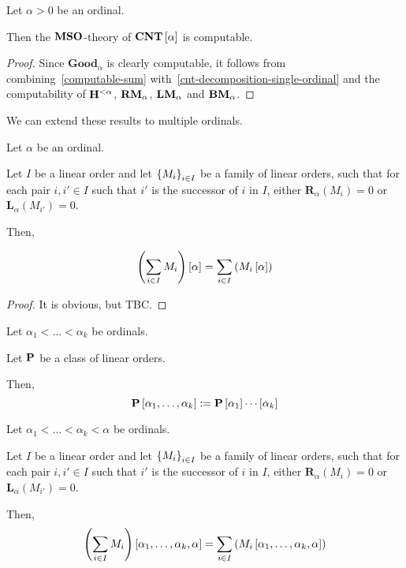 \begin{lemma}\label{cnt-decidable-single-ordinal}
  Let $\alpha > 0$ be an ordinal.

  Then the $\mathbf{MSO}$-theory of $\mathbf{CNT} \left[ {\alpha} \right]$ is computable.
\end{lemma}

\begin{proof}
  Since $\mathbf{Good}_{\alpha}$ is clearly computable,
  it follows from combining~\cref{computable-sum}
  with~\cref{cnt-decomposition-single-ordinal}
  and the computability of $\mathbf{H}^{< \alpha}$,
  $\mathbf{RM}_{\alpha}$, $\mathbf{LM}_{\alpha}$ and $\mathbf{BM}_{\alpha}$.
\end{proof}

We can extend these results to multiple ordinals.

\begin{lemma}\label{extend-lemma-single-ordinal}
  Let $\alpha$ be an ordinal.

  Let $I$ be a linear order
  and let $\left\{ {M_i} \right\}_{i \in I}$ be a family of linear orders,
  such that for each pair $i, i' \in I$
  such that $i'$ is the successor of $i$ in $I$,
  either $\mathbf{R}_\alpha(M_{i}) = 0$ or $\mathbf{L}_\alpha(M_{i'}) = 0$.

  Then,

  \[
    \left( { \sum_{i \in I} M_i } \right) \left[ {\alpha} \right] = \sum_{i \in I} \left( { M_i \left[ {\alpha} \right] } \right)
  \]
\end{lemma}

\begin{proof}
  It is obvious, but TBC.
\end{proof}

\begin{notation}
  Let $\alpha_1 < \ldots < \alpha_k$ be ordinals.

  Let $\mathbf{P}$ be a class of linear orders.

  Then,
  \[
    \mathbf{P} \left[ {\alpha_1, \ldots, \alpha_k} \right] := \mathbf{P} \left[ {\alpha_1} \right] \cdots \left[ {\alpha_k} \right]
  \]
\end{notation}

\begin{corollary}\label{extend-lemma-multiple-ordinals}
  Let $\alpha_1 < \ldots < \alpha_k < \alpha$ be ordinals.

  Let $I$ be a linear order
  and let $\left\{ {M_i} \right\}_{i \in I}$ be a family of linear orders,
  such that for each pair $i, i' \in I$
  such that $i'$ is the successor of $i$ in $I$,
  either $\mathbf{R}_\alpha(M_{i}) = 0$ or $\mathbf{L}_\alpha(M_{i'}) = 0$.

  Then,
  \[
    \left( { \sum_{i \in I} M_i } \right) \left[ {\alpha_1, \ldots, \alpha_k, \alpha} \right]
    = \sum_{i \in I} \left( { M_i \left[ {\alpha_1, \ldots, \alpha_k, \alpha} \right] } \right)
  \]
\end{corollary}

